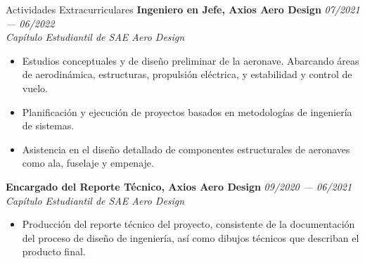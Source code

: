 \documentclass[letterpaper]{resume} %
\begin{document}
    
    
    
    
    \begin{rSection}{Actividades Extracurriculares}
        {\bf Ingeniero en Jefe, Axios Aero Design} \hfill {\itshape 07/2021 --- 06/2022} 
        \\{\textit{Capítulo Estudiantil de SAE Aero Design}}
        \begin{itemize}
            \item Estudios conceptuales y de diseño preliminar de la aeronave. Abarcando áreas de aerodinámica, estructuras, propulsión eléctrica, y estabilidad y control de vuelo. \item Planificación y ejecución de proyectos basados en metodologías de ingeniería de sistemas.
            \item  Asistencia en el diseño detallado de componentes estructurales de aeronaves como ala, fuselaje y empenaje.
        \end{itemize}

        {\bf Encargado del Reporte Técnico, Axios Aero Design} \hfill {\itshape 09/2020 --- 06/2021} 
        \\{\textit{Capítulo Estudiantil de SAE Aero Design}}
        \begin{itemize}
            \item Producción del reporte técnico del proyecto, consistente de la documentación del proceso de diseño de ingeniería, así como dibujos técnicos que describan el producto final.
        \end{itemize}
    \end{rSection}
    
\end{document}
